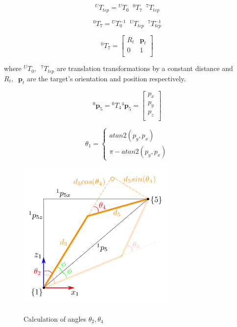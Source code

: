 \begin{equation}
{}^UT_{tcp} = {}^UT_0  \;\;  {}^0T_7  \;\;   {}^7T_{tcp}
\end{equation}

\begin{equation}
{}^0T_7 = {}^UT_0^{-1}  \;\;  {}^UT_{tcp}  \;\;  {}^7T_{tcp}^{-1}
\end{equation}

\begin{equation}
{}^0T_7 = \begin{bmatrix}
R_t & \mathbf{p}_t \\
0 & 1 \\
\end{bmatrix}
\end{equation}

where ${}^UT_0,  \;\;   {}^7T_{tcp}$ are translation transformations by a constant distance and $R_t,  \;\; \mathbf{p}_t$ are the target's orientation 
and position respectively.

\begin{equation}
{}^0\mathbf{p}_5 = {}^0T_4 {}^4\mathbf{p}_5 = \begin{bmatrix} p_x \\ p_y \\ p_z \\ \end{bmatrix}
\end{equation}

\begin{equation}
θ_1 = 
\begin{cases}
atan2 \left( p_y, p_x \right) \\
π - atan2 \left( p_y, p_x \right)
\end{cases}
\end{equation}

\begin{center}
\begin{figure}[!htb]
\centering
\includegraphics[width=8cm]{images/th2-4-calculation.png}\\
\caption{Calculation of angles $θ_2, θ_4$}
\label{iiwa14-solution-configurations}
\end{figure}
\end{center}

